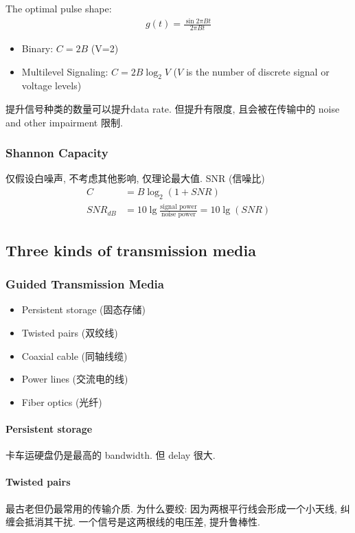The optimal pulse shape: %
\begin{align*}
    g(t)=\frac{\sin 2\pi Bt}{2\pi Bt}
\end{align*}
\begin{itemize}
    \item Binary: \textcolor{light_red}{$C = 2B$} (V=2)
    \item Multilevel Signaling: \textcolor{light_red}{$C = 2B \log_2 V$} ($V$ is the number of discrete signal or voltage levels)
\end{itemize}
提升信号种类的数量可以提升data rate. 但提升有限度, 且会被在传输中的 noise and other impairment 限制. 

\subsubsection{Shannon Capacity}
仅假设白噪声, 不考虑其他影响, 仅理论最大值. SNR (信噪比)
\begin{align*}
    C&=B\log_2 (1+SNR)\\
    SNR_{dB}&=10\lg\frac{\text{signal power}}{\text{noise power}}=10\lg(SNR)
\end{align*}

\subsection{Three kinds of transmission media}
\subsubsection{Guided Transmission Media}
\begin{itemize}
    \item Persistent storage (固态存储)
    \item Twisted pairs (双绞线)
    \item Coaxial cable (同轴线缆)
    \item Power lines (交流电的线)
    \item Fiber optics (光纤)
\end{itemize}

\paragraph{Persistent storage} 卡车运硬盘仍是最高的 bandwidth. 但 delay 很大. 

\paragraph{Twisted pairs} 最古老但仍最常用的传输介质. 为什么要绞: 因为两根平行线会形成一个小天线, 纠缠会抵消其干扰. 一个信号是这两根线的电压差, 提升鲁棒性. 

